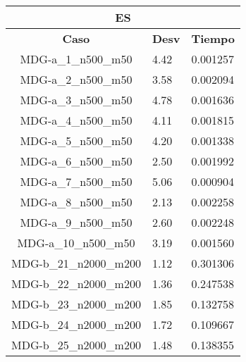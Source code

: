 \documentclass[10pt,a4paper]{article}
\begin{document}
\begin{table}[]
	\centering
	\begin{tabular}{|c|l|l|}
		\hline
		\multicolumn{3}{|c|}{\textbf{ES}}                                                                  \\ \hline
		\textbf{Caso}          & \multicolumn{1}{c|}{\textbf{Desv}} & \multicolumn{1}{c|}{\textbf{Tiempo}} \\ \hline
		MDG-a\_1\_n500\_m50    & 4.42                               & 0.001257                             \\ \hline
		MDG-a\_2\_n500\_m50    & 3.58                               & 0.002094                             \\ \hline
		MDG-a\_3\_n500\_m50    & 4.78                               & 0.001636                             \\ \hline
		MDG-a\_4\_n500\_m50    & 4.11                               & 0.001815                             \\ \hline
		MDG-a\_5\_n500\_m50    & 4.20                               & 0.001338                             \\ \hline
		MDG-a\_6\_n500\_m50    & 2.50                               & 0.001992                             \\ \hline
		MDG-a\_7\_n500\_m50    & 5.06                               & 0.000904                             \\ \hline
		MDG-a\_8\_n500\_m50    & 2.13                               & 0.002258                             \\ \hline
		MDG-a\_9\_n500\_m50    & 2.60                               & 0.002248                             \\ \hline
		MDG-a\_10\_n500\_m50   & 3.19                               & 0.001560                             \\ \hline
		MDG-b\_21\_n2000\_m200 & 1.12                               & 0.301306                             \\ \hline
		MDG-b\_22\_n2000\_m200 & 1.36                               & 0.247538                             \\ \hline
		MDG-b\_23\_n2000\_m200 & 1.85                               & 0.132758                             \\ \hline
		MDG-b\_24\_n2000\_m200 & 1.72                               & 0.109667                             \\ \hline
		MDG-b\_25\_n2000\_m200 & 1.48                               & 0.138355                             \\ \hline

\end{tabular}
\end{table}
\end{document}
